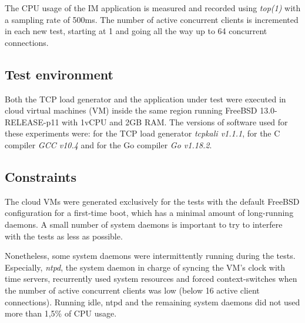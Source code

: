 The CPU usage of the IM application is measured and recorded using \textit{top(1)} with a sampling rate of 500ms. The number of active concurrent clients is incremented in each new test, starting at 1 and going all the way up to 64 concurrent connections.

\subsection{Test environment}
Both the TCP load generator and the application under test were executed in cloud virtual machines (VM) inside the same region running FreeBSD 13.0-RELEASE-p11 with 1vCPU and 2GB RAM. The versions of software used for these experiments were: for the TCP load generator \textit{tcpkali v1.1.1}, for the C compiler \textit{GCC v10.4} and for the Go compiler \textit{Go v1.18.2}.

\subsection{Constraints}
The cloud VMs were generated exclusively for the tests with the default FreeBSD configuration for a first-time boot, which has a minimal amount of long-running daemons. A small number of system daemons is important to try to interfere with the tests as less as possible. 

Nonetheless, some system daemons were intermittently running during the tests. Especially, \textit{ntpd}, the system daemon in charge of syncing the VM's clock with time servers, recurrently used system resources and forced context-switches when the number of active concurrent clients was low (below 16 active client connections). Running idle, ntpd and the remaining system daemons did not used more than 1,5\% of CPU usage.

